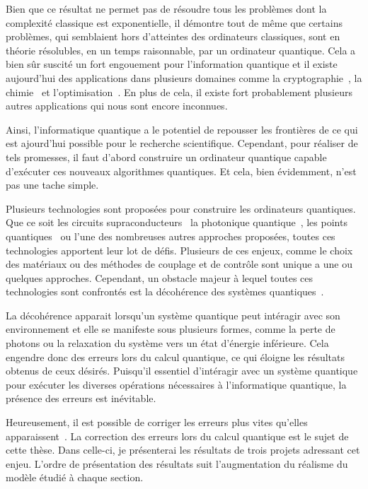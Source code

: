 Bien que ce résultat ne permet pas de résoudre tous les problèmes dont la complexité classique
est exponentielle,
il démontre tout de même que certains problèmes,
qui semblaient hors d'atteintes des ordinateurs classiques,
sont en théorie résolubles, en un temps raisonnable, par un ordinateur quantique.
Cela a bien sûr suscité un fort engouement pour l'information quantique et
il existe aujourd'hui des applications dans plusieurs domaines comme
la cryptographie~\cite{bennett_quantum_2014, gisin_quantum_2002}, 
la chimie~\cite{lanyon_towards_2010, mcardle_quantum_2020, cao_quantum_2019} 
et l'optimisation~\cite{montanaro_quantum_2016, grover_quantum_1997}.
En plus de cela,
il existe fort probablement plusieurs autres applications qui nous sont encore inconnues.

Ainsi,
l'informatique quantique a le potentiel de repousser les frontières de ce qui est ajourd'hui
possible pour le recherche scientifique.
Cependant,
pour réaliser de tels promesses,
il faut d'abord construire un ordinateur quantique capable d'exécuter ces nouveaux algorithmes quantiques.
Et cela,
bien évidemment,
n'est pas une tache simple.

Plusieurs technologies sont proposées pour construire les ordinateurs quantiques.
Que ce soit les circuits supraconducteurs~\cite{wallraf_strong_2004, krantz_quantum_2019}
la photonique quantique~\cite{obrien_photonic_2009, kok_linear_2007},
les points quantiques~\cite{pioro-ladriere_electrically_2008, loss_quantum_1998}
ou l'une des nombreuses autres approches proposées,
toutes ces technologies apportent leur lot de défis.
Plusieurs de ces enjeux,
comme le choix des matériaux ou
des méthodes de couplage et de contrôle
sont unique a une ou quelques approches.
Cependant,
un obstacle majeur à lequel toutes ces technologies sont confrontés
est la décohérence des systèmes quantiques~\cite{unruh_maintaining_1995, palma_quantum_1996}.

La décohérence apparait lorsqu'un système quantique peut intéragir avec son environnement
et elle se manifeste sous plusieurs formes, 
comme la perte de photons ou la relaxation du système vers un état d'énergie inférieure.
Cela engendre donc des erreurs lors du calcul quantique,
ce qui éloigne les résultats obtenus de ceux désirés.
Puisqu'il essentiel d'intéragir avec un système quantique pour exécuter les diverses 
opérations nécessaires à l'informatique quantique,
la présence des erreurs est inévitable.

Heureusement,
il est possible de corriger les erreurs plus vites qu'elles apparaissent~\cite{aharonov_fault-tolerant_1999}.
La correction des erreurs lors du calcul quantique est le sujet de cette thèse.
Dans celle-ci,
je présenterai les résultats de trois projets adressant cet enjeu.
L'ordre de présentation des résultats suit l'augmentation du réalisme du modèle étudié à chaque section.

